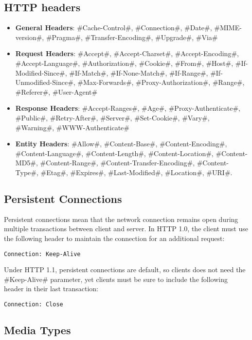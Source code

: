 \documentclass[a4paper]{article}
\begin{document}
\subsection{HTTP headers}
\begin{itemize}
  \item \textbf{General Headers}: #Cache-Control#, #Connection#, #Date#, #MIME-version#,
	#Pragma#, #Transfer-Encoding#, #Upgrade#, #Via#
  \item \textbf{Request Headers}: #Accept#, #Accept-Charset#, #Accept-Encoding#,
	#Accept-Language#, #Authorization#, #Cookie#, #From#, #Host#, #If-Modified-Since#,
	#If-Match#, #If-None-Match#, #If-Range#, #If-Unmodified-Since#, #Max-Forwards#,
	#Proxy-Authorization#, #Range#, #Referer#, #User-Agent#
  \item \textbf{Response Headers}: #Accept-Ranges#, #Age#, #Proxy-Authenticate#,
	#Public#, #Retry-After#, #Server#, #Set-Cookie#, #Vary#, #Warning#, #WWW-Authenticate#
  \item \textbf{Entity Headers}: #Allow#, #Content-Base#, #Content-Encoding#,
	#Content-Language#, #Content-Length#, #Content-Location#, #Content-MD5#,
	#Content-Range#, #Content-Transfer-Encoding#, #Content-Type#, #Etag#,
	#Expires#, #Last-Modified#, #Location#, #URI#.
\end{itemize}

\subsection{Persistent Connections}

Persistent connections mean that the network connection remains open during multiple transactions between client and server. 
In HTTP 1.0, the client must use the following header to maintain the connection for an additional request:
\begin{verbatim}
Connection: Keep-Alive
\end{verbatim}

Under HTTP 1.1, persistent connections are default, so clients does not need the #Keep-Alive# parameter,
yet clients must be sure to include the following header in their last transaction:
\begin{verbatim}
Connection: Close
\end{verbatim}

\subsection{Media Types}
\end{document}
